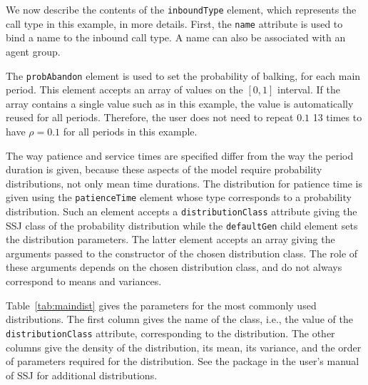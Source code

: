 We now describe the contents of the \texttt{inbound\-Type} element,
which represents the call type in this example, in more details.
First, the \texttt{name} attribute is used to bind a name to the
inbound call type.  A name can also be associated with an agent group.

The \texttt{prob\-Abandon} element is used to set the
probability of balking, for each main period.
This element accepts an array of values on the $[0,1]$ interval.
If the array contains a single value such as in this example, the
value is automatically reused for all
periods.  Therefore, the user does not need to repeat $0.1$ 13 times
to have $\rho=0.1$ for all periods in this example.

The way patience and service times are specified differ from the way
the period duration is given, because these aspects of the model
require probability
distributions, not only mean time durations.
The distribution for patience time is given using the
\texttt{patience\-Time} element
whose type corresponds to a probability distribution.
  Such an element
accepts a
\texttt{distribution\-Class} attribute giving the SSJ class of the
probability distribution while the \texttt{default\-Gen} child element
sets the distribution parameters.
The latter element accepts an array giving
the arguments passed to the constructor of the chosen
distribution class.
The role of these arguments depends on the chosen distribution class,
and do not always correspond to means and variances.

Table~\ref{tab:maindist} gives the parameters for the
most commonly used distributions.
The first column gives the name of the class, i.e., the value of the
\texttt{distribution\-Class} attribute, corresponding to the
distribution.
The other columns give the density of the distribution, its
mean, its variance, and
the
order of parameters required for the
distribution.
See the package 
in the
user's manual of SSJ \cite{iLEC04j} for additional distributions.

